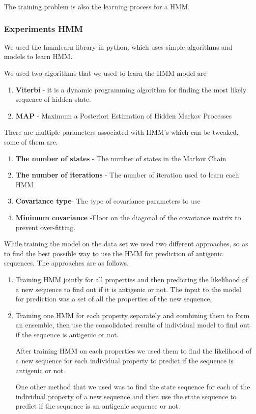 \documentclass[notitlepage]{article}
\begin{document}
   The training problem is also the learning process for a HMM.
   
   
   \subsubsection{Experiments HMM}
   
   We used the hmmlearn library in python, which uses simple algorithms and models to learn HMM.
   
   We used two algorithms that we used to learn the HMM model are
   \begin{enumerate}
   	\item \textbf{Viterbi} -  it is a dynamic programming algorithm for finding the most likely sequence of hidden state.
   	\item \textbf{MAP} - Maximum a Posteriori Estimation of Hidden Markov Processes
   \end{enumerate}

	There are multiple parameters associated with HMM's which can be tweaked, some of them are.
	
	\begin{enumerate}
		\item \textbf{The number of states} - The number of states in the Markov Chain
		\item \textbf{The number of iterations} - The number of iteration used to learn each HMM
		\item \textbf{Covariance type}- The type of covariance parameters to use
		\item \textbf{Minimum covariance }-Floor on the diagonal of the covariance matrix to prevent over-fitting. 
	\end{enumerate}
	
	While training the model on the data set we used two different approaches, so as to find the best possible way to use the HMM for prediction of antigenic sequences. The approaches are as follows.
	
	\begin{enumerate}
		\item Training HMM jointly for all properties and then predicting the likelihood of a new sequence to find out if it is antigenic or not. The input to the model for prediction was a set of all the properties of the new sequence.
		
		\item Training one HMM for each property separately and combining them to form an ensemble, then use the consolidated results of individual model to find out if the sequence is antigenic or not.
		
		After training HMM on each properties we used them to find the likelihood of a new sequence for each individual property to predict if the sequence is antigenic or not. 
		
		One other method that we used was to find the state sequence for each of the individual property of a new sequence and then use the state sequence to predict if the sequence is an antigenic sequence or not.   
		
	\end{enumerate} 
	
\end{document}
